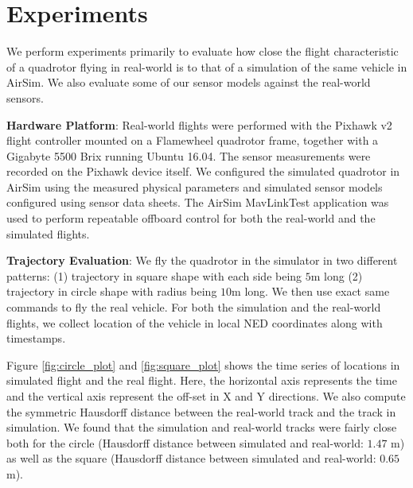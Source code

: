 \documentclass[graybox]{svmult}
\begin{document}
	
	
	\section{Experiments}
	We perform experiments primarily to evaluate how close the flight characteristic of a quadrotor flying in real-world is to that of a simulation of the same vehicle in AirSim. We also evaluate some of our sensor models against the real-world sensors.
	
	\vspace{0.075in}
	\noindent \textbf{Hardware Platform}: Real-world flights were performed with the Pixhawk v2 flight controller mounted on a Flamewheel quadrotor frame, together with a Gigabyte 5500 Brix running Ubuntu 16.04. The sensor measurements were recorded on the Pixhawk device itself. We configured the simulated quadrotor in AirSim using the measured physical parameters and simulated sensor models configured using sensor data sheets. The AirSim MavLinkTest application was used to perform repeatable offboard control for both the real-world and the simulated flights.
	
	\vspace{0.075in}
	\noindent \textbf{Trajectory Evaluation}: We fly the quadrotor in the simulator in two different patterns: (1) trajectory in square shape with each side being $5$m long (2) trajectory in circle shape with radius being $10$m long. We then use exact same commands to fly the real vehicle. For both the simulation and the real-world flights, we collect location of the vehicle in local NED coordinates along with timestamps.
	
	Figure \ref{fig:circle_plot} and \ref{fig:square_plot} shows the time series of locations in simulated flight and the real flight. Here, the horizontal axis represents the time and the vertical axis represent the off-set in X and Y directions. We also compute the symmetric Hausdorff distance between the real-world track and the track in simulation. We found that the simulation and real-world tracks were fairly close both for the circle (Hausdorff distance between simulated and real-world: $1.47$ m) as well as the square (Hausdorff distance between simulated and real-world: $0.65$ m).
	
\end{document}
